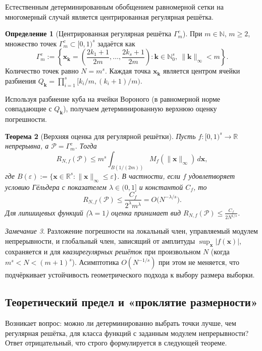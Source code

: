 \documentclass[12pt, a4paper]{article}
\theoremstyle{plain}
\newtheorem{theorem}{Теорема}[section]
\theoremstyle{definition}
\newtheorem{definition}[theorem]{Определение}
\theoremstyle{remark}
\newtheorem{remark}[theorem]{Замечание}
\newcommand{\NN}{\mathbb{N}}
\newcommand{\NNz}{\mathbb{N}_0}
\newcommand{\RR}{\mathbb{R}}
\newcommand{\II}{[0, 1)}
\newcommand{\PP}{\mathcal{P}}
\newcommand{\vx}{\boldsymbol{x}}
\newcommand{\vk}{\boldsymbol{k}}   %
\begin{document}
Естественным детерминированным обобщением равномерной сетки на многомерный случай является центрированная регулярная решётка.

\begin{definition}[Центрированная регулярная решётка $\Gamma_m^c$]
При $m \in \NN$, $m \ge 2$, множество точек $\Gamma_m^c \subset \II^s$ задаётся как
\[
\Gamma_m^c := \left\{ \vx_{\vk} = \left( \frac{2k_1+1}{2m}, \dots, \frac{2k_s+1}{2m} \right) : \vk \in \NNz^s,\ \|\vk\|_\infty < m \right\}.
\]
Количество точек равно $N = m^s$. Каждая точка $\vx_{\vk}$ является центром ячейки разбиения $Q_{\vk} = \prod_{i=1}^s [k_i/m, (k_i+1)/m)$.
\end{definition}

Используя разбиение куба на ячейки Вороного (в равномерной норме совпадающие с $Q_{\vk}$), получаем детерминированную верхнюю оценку погрешности.

\begin{theorem}[Верхняя оценка для регулярной решётки]
Пусть $f: \II^s \to \RR$ непрерывна, а $\PP = \Gamma_m^c$. Тогда
\[
R_{N,f}(\PP) \le m^s \int_{B(1/(2m))} M_f(\|\vx\|_\infty) \, d\vx,
\]
где $B(\varepsilon) := \{\vx \in \RR^s : \|\vx\|_\infty \le \varepsilon\}$. В частности, если $f$ удовлетворяет условию Гёльдера с показателем $\lambda \in (0,1]$ и константой $C_f$, то
\[
R_{N,f}(\PP) \le \frac{C_f}{2^\lambda m^\lambda} = O\bigl(N^{-\lambda/s}\bigr).
\]
Для липшицевых функций ($\lambda=1$) оценка принимает вид $R_{N,f}(\PP) \le \frac{C_f}{2N^{1/s}}$.
\end{theorem}

\begin{remark}
Разложение погрешности на локальный член, управляемый модулем непрерывности, и глобальный член, зависящий от амплитуды $\sup_{\vx}|f(\vx)|$, сохраняется и для \textit{квазирегулярных решёток} при произвольном $N$ (когда $m^s < N < (m+1)^s$). Асимптотика $O(N^{-1/s})$ при этом не меняется, что подчёркивает устойчивость геометрического подхода к выбору размера выборки.
\end{remark}

\subsection{Теоретический предел и «проклятие размерности»}
Возникает вопрос: можно ли детерминированно выбрать точки лучше, чем регулярная решётка, для класса функций с заданным модулем непрерывности? Ответ отрицательный, что строго формулируется в следующей теореме.
\end{document}
